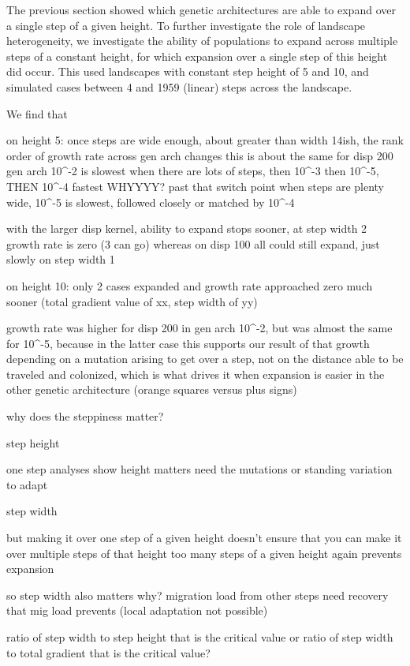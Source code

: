 The previous section showed which genetic architectures are able to expand over a single step of a given height. To further investigate the role of landscape heterogeneity, we investigate the ability of populations to expand across multiple steps of a constant height, for which expansion over a single step of this height did occur. This used landscapes with constant step height of 5 and 10, and simulated cases between 4 and 1959 (linear) steps across the landscape.

We find that 

on height 5:
once steps are wide enough, about greater than width 14ish, the rank order of growth rate across gen arch changes
this is about the same for disp 200
gen arch 10^-2 is slowest when there are lots of steps, then 10^-3 then 10^-5, THEN 10^-4 fastest WHYYYY?
past that switch point when steps are plenty wide, 10^-5 is slowest, followed closely or matched by 10^-4

with the larger disp kernel, ability to expand stops sooner, at step width 2 growth rate is zero (3 can go) whereas on disp 100 all could still expand, just slowly on step width 1


on height 10:
only 2 cases expanded and growth rate approached zero much sooner (total gradient value of xx, step width of yy)

growth rate was higher for disp 200 in gen arch 10^-2, but was almost the same for 10^-5, because in the latter case this supports our result of that growth depending on a mutation arising to get over a step, not on the distance able to be traveled and colonized, which is what drives it when expansion is easier in the other genetic architecture (orange squares versus plus signs)

why does the steppiness matter?

step height

	one step analyses show height matters
	need the mutations or standing variation to adapt


step width

	but making it over one step of a given height doesn't ensure that you can make it over multiple steps of that height
	too many steps of a given height again prevents expansion
	
	so step width also matters
		why?
		migration load from other steps
		need recovery that mig load prevents (local adaptation not possible)
		
		ratio of step width to step height that is the critical value
		or ratio of step width to total gradient that is the critical value?






